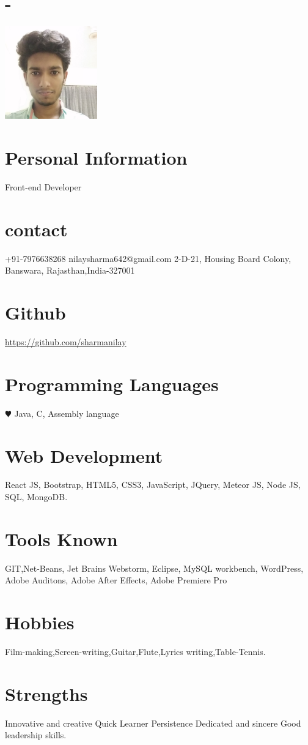 \documentclass[english]{cv-style}     %
\begin{document}


\begin{aside}
\section{-}
\includegraphics[width=4cm]{23}
%
\section{Personal Information}
Front-end Developer
%
\section{contact}
+91-7976638268
nilaysharma642@gmail.com
2-D-21, Housing Board Colony,
Banswara, Rajasthan,India-327001
%
\section{Github}
\href{https://github.com/sharmanilay}{https://github.com/sharmanilay}
%
\section{Programming Languages}
{\color{red} $\varheartsuit$} Java, C, Assembly language
%
\section{Web Development}
React JS, Bootstrap, HTML5, CSS3, JavaScript, JQuery, Meteor JS, Node JS, SQL, MongoDB.
%
\section{Tools Known}
GIT,Net-Beans, Jet Brains Webstorm, Eclipse, MySQL workbench, WordPress, Adobe Auditons, Adobe After Effects, Adobe Premiere Pro
%
\section{Hobbies}
Film-making,Screen-writing,Guitar,Flute,Lyrics writing,Table-Tennis.
%
\section{Strengths}
Innovative and creative
Quick Learner
Persistence
Dedicated and sincere
Good leadership skills.
%
\end{aside}
\end{document}
